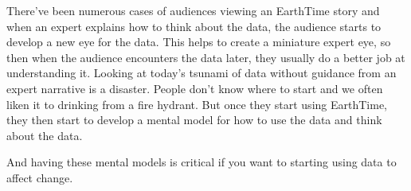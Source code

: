 \documentclass[
  12pt,
]{krantz}
\begin{document}
There've been numerous cases of audiences viewing an EarthTime story and when an expert explains how to think about the data, the audience starts to develop a new eye for the data. This helps to create a miniature expert eye, so then when the audience encounters the data later, they usually do a better job at understanding it. Looking at today's tsunami of data without guidance from an expert narrative is a disaster. People don't know where to start and we often liken it to drinking from a fire hydrant. But once they start using EarthTime, they then start to develop a mental model for how to use the data and think about the data.

And having these mental models is critical if you want to starting using data to affect change.

  

\backmatter
\printindex
\end{document}
